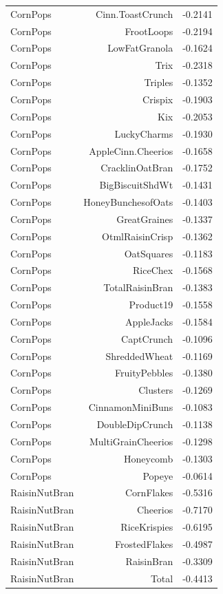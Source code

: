 \begin{longtable}{@{}lrr@{}}
CornPops & Cinn.ToastCrunch & -0.2141 \\
CornPops & FrootLoops & -0.2194 \\
CornPops & LowFatGranola & -0.1624 \\
CornPops & Trix & -0.2318 \\
CornPops & Triples & -0.1352 \\
CornPops & Crispix & -0.1903 \\
CornPops & Kix & -0.2053 \\
CornPops & LuckyCharms & -0.1930 \\
CornPops & AppleCinn.Cheerios & -0.1658 \\
CornPops & CracklinOatBran & -0.1752 \\
CornPops & BigBiscuitShdWt & -0.1431 \\
CornPops & HoneyBunchesofOats & -0.1403 \\
CornPops & GreatGraines & -0.1337 \\
CornPops & OtmlRaisinCrisp & -0.1362 \\
CornPops & OatSquares & -0.1183 \\
CornPops & RiceChex & -0.1568 \\
CornPops & TotalRaisinBran & -0.1383 \\
CornPops & Product19 & -0.1558 \\
CornPops & AppleJacks & -0.1584 \\
CornPops & CaptCrunch & -0.1096 \\
CornPops & ShreddedWheat & -0.1169 \\
CornPops & FruityPebbles & -0.1380 \\
CornPops & Clusters & -0.1269 \\
CornPops & CinnamonMiniBuns & -0.1083 \\
CornPops & DoubleDipCrunch & -0.1138 \\
CornPops & MultiGrainCheerios & -0.1298 \\
CornPops & Honeycomb & -0.1303 \\
CornPops & Popeye & -0.0614 \\
RaisinNutBran & CornFlakes & -0.5316 \\
RaisinNutBran & Cheerios & -0.7170 \\
RaisinNutBran & RiceKrispies & -0.6195 \\
RaisinNutBran & FrostedFlakes & -0.4987 \\
RaisinNutBran & RaisinBran & -0.3309 \\
RaisinNutBran & Total & -0.4413 \\

\end{longtable}

